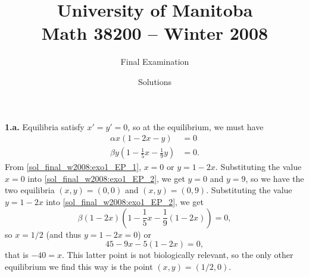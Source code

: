 \documentclass[12pt]{article}
\title{University of Manitoba\\ Math 38200 -- Winter 2008}
\author{Final Examination}
\date{Solutions}
\theoremstyle{plain}
\begin{document}
\maketitle

\textbf{1.a.}
Equilibria satisfy $x'=y'=0$, so at the equilibrium, we must have
\begin{subequations}\label{sol_final_w2008:exo1_EP}
\begin{align}
\alpha x(1-2x-y) &=0 \label{sol_final_w2008:exo1_EP_1}\\
\beta y\left(1-\frac 15x-\frac 19y\right) &=0.\label{sol_final_w2008:exo1_EP_2}
\end{align}
\end{subequations}
From \eqref{sol_final_w2008:exo1_EP_1}, $x=0$ or $y=1-2x$. Substituting the value $x=0$ into \eqref{sol_final_w2008:exo1_EP_2}, we get $y=0$ and $y=9$, so we have the two equilibria $(x,y)=(0,0)$ and $(x,y)=(0,9)$. Substituting the value $y=1-2x$ into \eqref{sol_final_w2008:exo1_EP_2}, we get
\[
\beta(1-2x)\left(
1-\frac 15 x-\frac 19 (1-2x)
\right)=0,
\]
so $x=1/2$ (and thus $y=1-2x=0$) or 
\[
45-9x-5(1-2x)=0,
\]
that is $-40=x$. This latter point is not biologically relevant, so the only other equilibrium we find this way is the point $(x,y)=(1/2,0)$.
\end{document}
